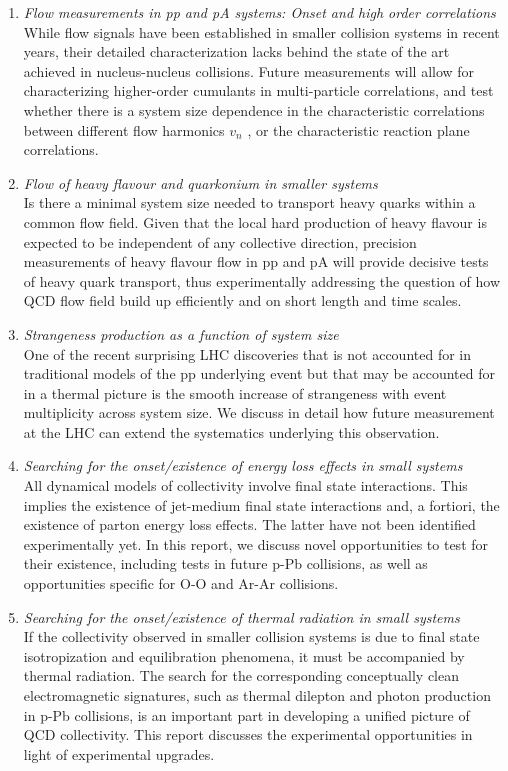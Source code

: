 \documentclass[../report.tex]{subfiles}
\begin{document}
\begin{enumerate}
\item {\it Flow measurements in pp and pA systems: Onset and high order correlations}\\ While flow signals have been established in smaller collision systems in recent years, their detailed characterization lacks behind the state of the art achieved in nucleus-nucleus collisions. Future measurements will allow for characterizing higher-order cumulants in multi-particle correlations, and test whether  there is a system size dependence in the characteristic correlations between different flow harmonics $v_n$ , or the characteristic reaction plane correlations. 
\item {\it Flow of heavy flavour and quarkonium in smaller systems}\\  Is there a minimal system size needed to transport heavy quarks within a common flow field. Given that the local hard production of heavy flavour is expected to be independent of any collective direction, precision measurements of heavy flavour flow in pp and pA will provide decisive tests of heavy quark transport, thus experimentally addressing the question of how QCD flow field build up efficiently and on short length and time scales.
\item  {\it Strangeness production as a function of system size}\\ One of the recent surprising LHC discoveries that is not accounted for in traditional models of the pp underlying event but that may be accounted for in a thermal picture is the smooth increase of strangeness with event multiplicity across system size. We discuss in detail how future measurement at the LHC can extend the systematics underlying this observation.
\item {\it Searching for the onset/existence of energy loss effects in small systems}\\ All dynamical models of collectivity involve final state interactions. This implies the existence of jet-medium final state interactions and, a fortiori, the existence of parton energy loss effects. The latter have not been identified experimentally yet. In this report, we discuss novel opportunities to test for their existence, including tests in future p-Pb collisions, as well as opportunities specific for O-O and Ar-Ar collisions.
\item {\it Searching for the onset/existence of thermal radiation in small systems}\\ If the collectivity observed in smaller collision systems is due to final state isotropization and equilibration phenomena, it must be accompanied by thermal radiation. The search for the corresponding conceptually clean electromagnetic signatures, such as thermal dilepton and photon production in p-Pb collisions, is an important part in developing a unified  picture of QCD collectivity. This report discusses the experimental opportunities in light of experimental upgrades.   
\end{enumerate}
\end{document}
